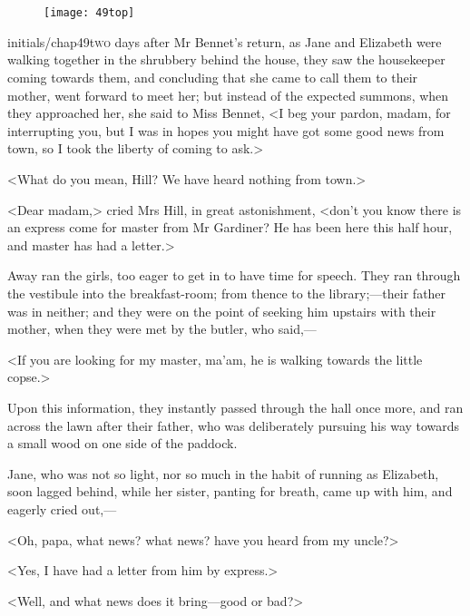 \chapter[Chapter \thechapter]{}
	
	
\begin{figure}[t!]
\centering
\texttt{[image: 49top]}
\end{figure}


\lettrine[lines=6,image=true]{initials/chap49t}{wo}  days after Mr Bennet's return, as Jane and Elizabeth were walking together in the shrubbery behind the house, they saw the housekeeper coming towards them, and concluding that she came to call them to their mother, went forward to meet her; but instead of the expected summons, when they approached her, she said to Miss Bennet, <I beg your pardon, madam, for interrupting you, but I was in hopes you might have got some good news from town, so I took the liberty of coming to ask.>

<What do you mean, Hill? We have heard nothing from town.>

<Dear madam,> cried Mrs Hill, in great astonishment, <don't you know there is an express come for master from Mr Gardiner? He has been here this half hour, and master has had a letter.>

Away ran the girls, too eager to get in to have time for speech. They ran through the vestibule into the breakfast-room; from thence to the library;—their father was in neither; and they were on the point of seeking him upstairs with their mother, when they were met by the butler, who said,—

<If you are looking for my master, ma'am, he is walking towards the little copse.>

Upon this information, they instantly passed through the hall once more, and ran across the lawn after their father, who was deliberately pursuing his way towards a small wood on one side of the paddock.

Jane, who was not so light, nor so much in the habit of running as Elizabeth, soon lagged behind, while her sister, panting for breath, came up with him, and eagerly cried out,—

<Oh, papa, what news? what news? have you heard from my uncle?>

<Yes, I have had a letter from him by express.>

<Well, and what news does it bring—good or bad?>

